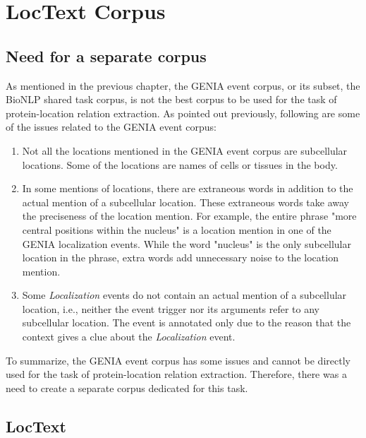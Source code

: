 \chapter{LocText Corpus}\label{chapter:corpus}

\section{Need for a separate corpus}

As mentioned in the previous chapter, the GENIA event corpus, or its subset, the BioNLP shared task corpus, is not the best corpus to be used for the task of protein-location relation extraction. As pointed out previously, following are some of the issues related to the GENIA event corpus:

\begin{enumerate}

\item Not all the locations mentioned in the GENIA event corpus are subcellular locations. Some of the locations are names of cells or tissues in the body.

\item In some mentions of locations, there are extraneous words in addition to the actual mention of a subcellular location. These extraneous words take away the preciseness of the location mention. For example, the entire phrase "more central positions within the nucleus" is a location mention in one of the GENIA localization events. While the word "nucleus" is the only subcellular location in the phrase, extra words add unnecessary noise to the location mention.

\item Some \textit{Localization} events do not contain an actual mention of a subcellular location, i.e., neither the event trigger nor its arguments refer to any subcellular location. The event is annotated only due to the reason that the context gives a clue about the \textit{Localization} event.

\end{enumerate}

To summarize, the GENIA event corpus has some issues and cannot be directly used for the task of protein-location relation extraction. Therefore, there was a need to create a separate corpus dedicated for this task.

\section{LocText}\label{sec:LocTextCorpus}

